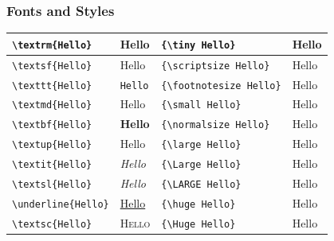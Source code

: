 \documentclass{beamer}
\begin{document}
\begin{frame}[fragile]
\frametitle{Fonts and Styles}
\begin{tabular}[c]{|l l|l l|}
\hline
\verb!\textrm{Hello}! & \textrm{Hello} & \verb!{\tiny Hello}! & {\tiny Hello} \\
\hline
\verb!\textsf{Hello}! & \textsf{Hello} & \verb!{\scriptsize Hello}! & {\scriptsize Hello} \\
\hline
\verb!\texttt{Hello}! & \texttt{Hello} & \verb!{\footnotesize Hello}! & {\footnotesize Hello} \\
\hline
\verb!\textmd{Hello}! & \textmd{Hello} & \verb!{\small Hello}! & {\small Hello} \\
\hline
\verb!\textbf{Hello}! & \textbf{Hello} & \verb!{\normalsize Hello}! & {\normalsize Hello} \\
\hline
\verb!\textup{Hello}! & \textup{Hello} & \verb!{\large Hello}! & {\large Hello} \\
\hline
\verb!\textit{Hello}! & \textit{Hello} & \verb!{\Large Hello}! & {\Large Hello} \\
\hline
\verb!\textsl{Hello}! & \textsl{Hello} & \verb!{\LARGE Hello}! & {\LARGE Hello} \\
\hline
\verb!\underline{Hello}! & \underline{Hello} & \verb!{\huge Hello}! & {\huge Hello} \\
\hline
\verb!\textsc{Hello}! & \textsc{Hello} & \verb!{\Huge Hello}! & {\Huge Hello} \\
\hline
\end{tabular}
\end{frame}
        
\end{document}
